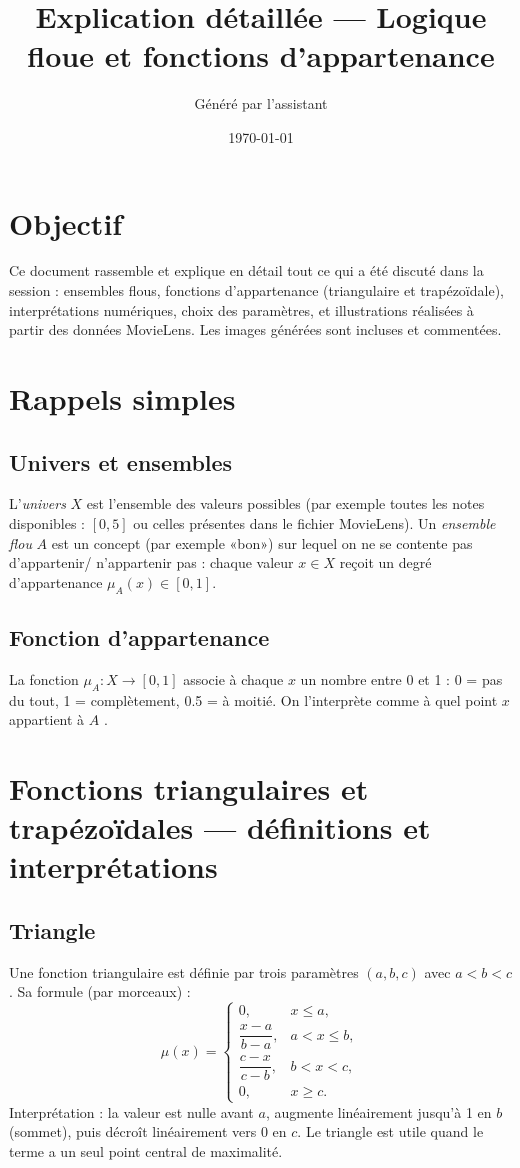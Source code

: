 \documentclass[a4paper,11pt]{article}
\title{Explication détaillée — Logique floue et fonctions d'appartenance}
\author{Généré par l'assistant}
\date{\today}
\begin{document}
\maketitle

\section*{Objectif}
Ce document rassemble et explique en détail tout ce qui a été discuté dans la session : ensembles flous, fonctions d'appartenance (triangulaire et trapézoïdale), interprétations numériques, choix des paramètres, et illustrations réalisées à partir des données MovieLens. Les images générées sont incluses et commentées.

\section{Rappels simples}
\subsection{Univers et ensembles}
L'\emph{univers} $X$ est l'ensemble des valeurs possibles (par exemple toutes les notes disponibles : $[0,5]$ ou celles présentes dans le fichier MovieLens). Un \emph{ensemble flou} $A$ est un concept (par exemple «bon») sur lequel on ne se contente pas d'appartenir/ n'appartenir pas : chaque valeur $x\in X$ reçoit un degr\'e d'appartenance $\mu_A(x)\in[0,1]$.

\subsection{Fonction d'appartenance}
La fonction $\mu_A : X \to [0,1]$ associe à chaque $x$ un nombre entre 0 et 1 : 0 = pas du tout, 1 = complètement, 0.5 = à moitié. On l'interprète comme \og à quel point $x$ appartient à $A$ \fg{}.

\section{Fonctions triangulaires et trapézoïdales — définitions et interprétations}
\subsection{Triangle}
Une fonction triangulaire est définie par trois paramètres $(a,b,c)$ avec $a<b<c$. Sa formule (par morceaux) :
\[
\mu(x)=\begin{cases}
0, & x\le a,\\
\dfrac{x-a}{b-a}, & a < x \le b,\\
\dfrac{c-x}{c-b}, & b < x < c,\\
0, & x\ge c.
\end{cases}
\]
Interprétation : la valeur est nulle avant $a$, augmente linéairement jusqu'à 1 en $b$ (sommet), puis décroît linéairement vers 0 en $c$. Le triangle est utile quand le terme a un seul point central de maximalité.
\end{document}
